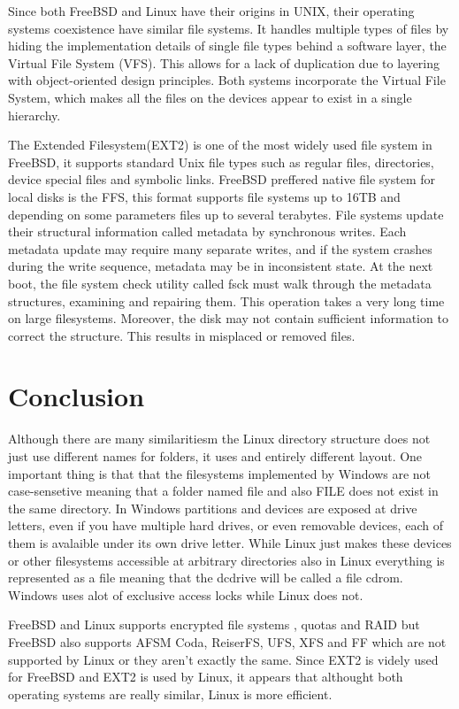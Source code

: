 \documentclass[letterpaper,10pt,draftclsnofoot,onecolumn]{IEEEtran}
\begin{document}
Since both FreeBSD and Linux have their origins in UNIX, their operating systems coexistence have similar file systems. It handles multiple types of files by hiding the implementation details of single file types behind a software layer, the Virtual File System (VFS). This allows for a lack of duplication due to layering with object-oriented design principles. Both systems incorporate the Virtual File System, which makes all the files on the devices appear to exist in a single hierarchy. 

The Extended Filesystem(EXT2) is one of the most widely used file system in FreeBSD, it supports standard Unix file types such as regular files, directories, device special files and symbolic links. FreeBSD preffered native file system for local disks is the FFS, this format supports file systems up to 16TB and depending on some parameters files up to several terabytes. 
File systems update their structural information called metadata by synchronous writes. Each metadata update may require many separate writes, and if the system crashes during the write sequence, metadata may be in inconsistent state. At the next boot, the file system check utility called fsck must walk through the metadata structures, examining and repairing them. This operation takes a very long time on large filesystems. Moreover, the disk may not contain sufficient information to correct the structure. This results in misplaced or removed files.\cite{[2]}
 

\section*{Conclusion}

Although there are many similaritiesm the Linux directory structure does not just use different names for folders, it uses and entirely different layout. One important thing is that that the filesystems implemented by Windows are not case-sensetive meaning that a folder named file and also FILE does not exist in the same directory. In Windows partitions and devices are exposed at drive letters, even if you have multiple hard drives, or even removable devices, each of them is avalaible under its own drive letter. While Linux just makes these devices or other filesystems accessible at arbitrary directories also in Linux everything is represented as a file meaning that the dcdrive will be called a file cdrom. Windows uses alot of exclusive access locks while Linux does not.

FreeBSD and Linux supports encrypted file systems , quotas and RAID but FreeBSD also supports AFSM Coda, ReiserFS, UFS, XFS and FF which are not supported by Linux or they aren't exactly the same. Since EXT2 is videly used for FreeBSD and EXT2 is used by Linux, it appears that althought both operating systems are really similar, Linux is more efficient.



\end{document}
